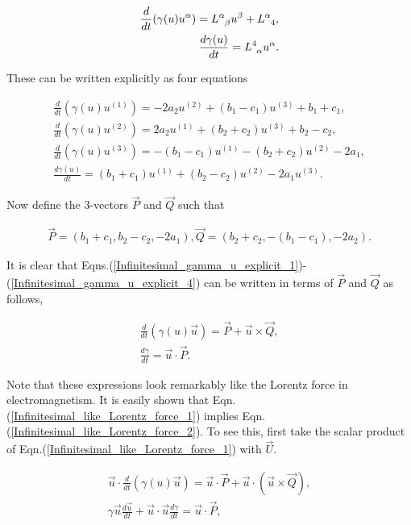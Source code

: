 \begin{eqnarray*} 
\frac{d}{dt} (\gamma(u) u^{\alpha}) = \tensor{L}{^{\alpha}_{\beta}} u^{\beta} + \tensor{L}{^{\alpha}_{4}}, \\
\frac{d\gamma(u)}{dt} = \tensor{L}{^{4}_{\alpha}} u^{\alpha}.
\end{eqnarray*} 

\noindent These can be written explicitly as four equations

\begin{eqnarray}\label{Infinitesimal_gamma_u_explicit_1}
\frac{d}{dt} (\gamma(u) u^{(1)}) = -2a_2u^{(2)} + (b_1 - c_1)u^{(3)} + b_1 + c_1, \\ \label{Infinitesimal_gamma_u_explicit_2}
\frac{d}{dt} (\gamma(u) u^{(2)}) = 2a_2 u^{(1)} + (b_2 + c_2) u^{(3)} + b_2 - c_2,\\ \label{Infinitesimal_gamma_u_explicit_3}
\frac{d}{dt} (\gamma(u) u^{(3)}) = -(b_1 - c_1) u^{(1)} - (b_2 + c_2 )u^{(2)} - 2a_1,\\ \label{Infinitesimal_gamma_u_explicit_4}
\frac{d\gamma(u)}{dt} = (b_1 + c_1)u^{(1)} + (b_2 - c_2) u^{(2)} - 2a_1 u^{(3)}.
\end{eqnarray}

Now define the $3$-vectors $\vec{P}$ and $\vec{Q}$ such that

\begin{eqnarray*}
\vec{P} = (b_1+c_1,b_2-c_2,-2a_1),
\vec{Q} = (b_2 + c_2, -(b_1 - c_1),-2a_2).
\end{eqnarray*}

It is clear that Eqns.(\ref{Infinitesimal_gamma_u_explicit_1})-(\ref{Infinitesimal_gamma_u_explicit_4}) can be written in terms of $\vec{P}$ and $\vec{Q}$ as follows,

\begin{eqnarray}\label{Infinitesimal_like_Lorentz_force_1}
\frac{d}{dt} (\gamma(u)\vec{u}) = \vec{P} + \vec{u} \times \vec{Q}, \\ \label{Infinitesimal_like_Lorentz_force_2}
\frac{d\gamma}{dt} = \vec{u} \cdot \vec{P}.
\end{eqnarray}

\noindent Note that these expressions look remarkably like the Lorentz force in electromagnetism. It is easily shown that Eqn.(\ref{Infinitesimal_like_Lorentz_force_1}) implies Eqn.(\ref{Infinitesimal_like_Lorentz_force_2}). To see this, first take the scalar product of Eqn.(\ref{Infinitesimal_like_Lorentz_force_1}) with $\vec{U}$.

\begin{eqnarray}\label{Infinitesimal_1_imples_2_calc_1}
\vec{u} \cdot \frac{d}{dt} (\gamma(u)\vec{u}) = \vec{u} \cdot \vec{P} + \vec{u} \cdot (\vec{u} \times \vec{Q}), \\ \label{Infinitesimal_1_imples_2_calc_2}
\gamma \vec{u} \frac{d\vec{u}}{dt} + \vec{u} \cdot \vec{u} \frac{d\gamma}{dt} = \vec{u} \cdot \vec{P},
\end{eqnarray}


